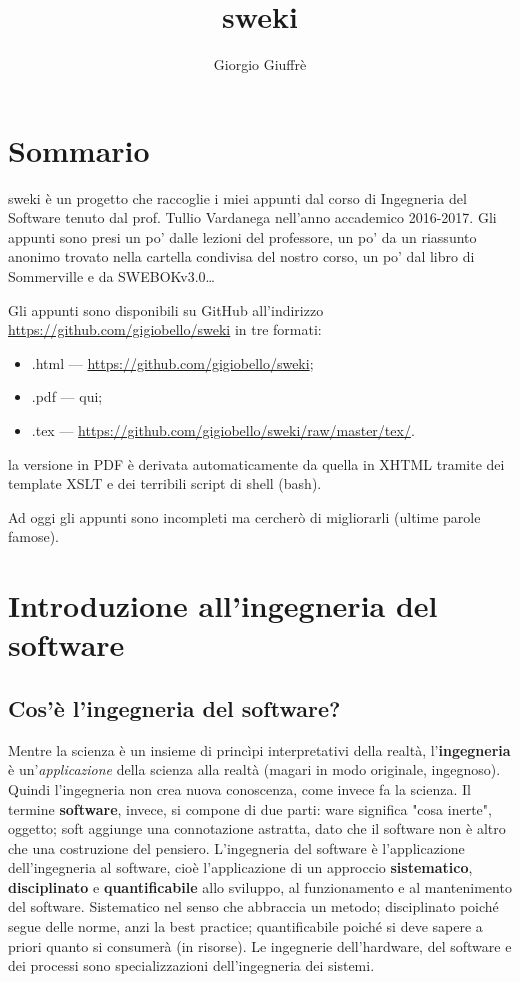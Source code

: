 \documentclass[a4paper]{article}
\title{sweki}
\author{Giorgio Giuffrè}
\date{}
\begin{document}
\maketitle
\tableofcontents
\newpage


\section{Sommario}
sweki è un progetto che raccoglie i miei appunti dal corso di Ingegneria del Software tenuto dal prof. Tullio Vardanega nell'anno accademico 2016-2017. Gli appunti sono presi un po' dalle lezioni del professore, un po' da un riassunto anonimo trovato nella cartella condivisa del nostro corso, un po' dal libro di Sommerville e da SWEBOKv3.0\dots

Gli appunti sono disponibili su GitHub all'indirizzo \url{https://github.com/gigiobello/sweki} in tre formati:
\begin{itemize}
	\item .html --- \url{https://github.com/gigiobello/sweki};
	\item .pdf --- qui;
	\item .tex --- \url{https://github.com/gigiobello/sweki/raw/master/tex/}.
\end{itemize}

la versione in PDF è derivata automaticamente da quella in XHTML tramite dei template XSLT e dei terribili script di shell (bash).

Ad oggi gli appunti sono incompleti ma cercherò di migliorarli (ultime parole famose).



		
	\section{Introduzione all'ingegneria del software}


		
	\subsection{Cos'è l'ingegneria del software?}

		
Mentre la scienza è un insieme di princìpi interpretativi della realtà, l'\textbf{ingegneria} è un'\emph{applicazione} della scienza alla realtà (magari in modo originale, ingegnoso). Quindi l'ingegneria non crea nuova conoscenza, come invece fa la scienza. Il termine \textbf{software}, invece, si compone di due parti: ware significa "cosa inerte", oggetto; soft aggiunge una connotazione astratta, dato che il software non è altro che una costruzione del pensiero. L'ingegneria del software è l'applicazione dell'ingegneria al software, cioè l'applicazione di un approccio \textbf{sistematico}, \textbf{disciplinato} e \textbf{quantificabile} allo sviluppo, al funzionamento e al mantenimento del software. Sistematico nel senso che abbraccia un metodo; disciplinato poiché segue delle norme, anzi la best practice; quantificabile poiché si deve sapere a priori quanto si consumerà (in risorse). Le ingegnerie dell'hardware, del software e dei processi sono specializzazioni dell'ingegneria dei sistemi.
\end{document}
